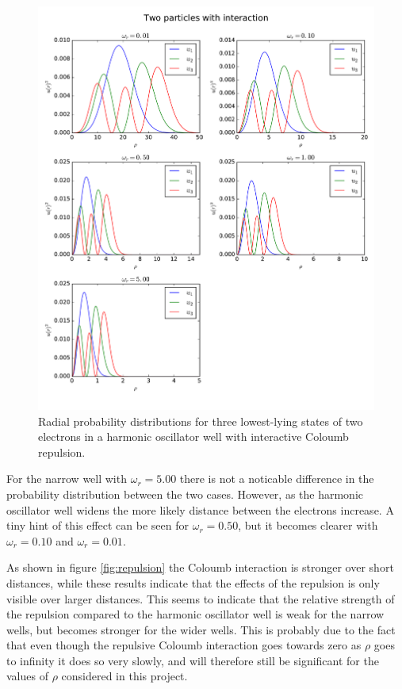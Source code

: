 \documentclass{article}
\begin{document}
\begin{figure}[h]
    \includegraphics[width=\linewidth]{fig/Two_particles_with_interaction.pdf}
    \caption{Radial probability distributions for three lowest-lying states of two electrons in a harmonic oscillator well with interactive Coloumb repulsion.}
    \label{fig:two_inter}
\end{figure}

For the narrow well with $\omega_r=5.00$ there is not a noticable difference in the probability distribution between the two cases. However, as the harmonic oscillator well widens the more likely distance between the electrons increase. A tiny hint of this effect can be seen for $\omega_r=0.50$, but it becomes clearer with $\omega_r=0.10$ and $\omega_r=0.01$.

As shown in figure \ref{fig:repulsion} the Coloumb interaction is stronger over short distances, while these results indicate that the effects of the repulsion is only visible over larger distances. This seems to indicate that the relative strength of the repulsion compared to the harmonic oscillator well is weak for the narrow wells, but becomes stronger for the wider wells. This is probably due to the fact that even though the repulsive Coloumb interaction goes towards zero as $\rho$ goes to infinity it does so very slowly, and will therefore still be significant for the values of $\rho$ considered in this project. 
\end{document}
